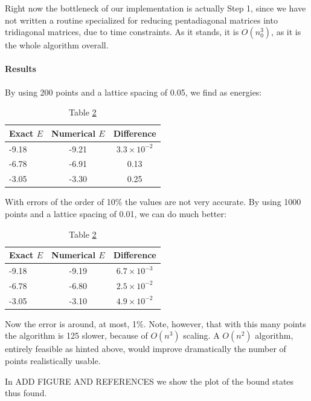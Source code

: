 \documentclass[a4paper,11]{article}
\begin{document}
Right now the bottleneck of our implementation is actually Step 1, since we 
have not written a routine specialized for reducing pentadiagonal matrices
into tridiagonal matrices, due to time constraints. 
As it stands, it is $O(n_{0}^{3})$, as it is the whole algorithm overall.

\paragraph{Results}

By using 200 points and a lattice spacing of 0.05, we find as energies:

\begin{table}[ht]
	\centering
	\begin{tabular}{l | c | c }
		Exact $E$ & Numerical $E$ & Difference \\
		\hline
		-9.18 & -9.21 & $3.3 \times 10^{-2}$ \\
		-6.78 & -6.91 & 0.13 \\
		-3.05 & -3.30 & 0.25
	\end{tabular}
	\caption{Table \ref{table:poschl_teller}}
	\label{table:poschl_teller}
\end{table}

With errors of the order of 10\% the values are not very accurate.
By using 1000 points and a lattice spacing of 0.01, we can do much better:

\begin{table}[ht]
	\centering
	\begin{tabular}{l | c | c }
		Exact $E$ & Numerical $E$ & Difference \\
		\hline
		-9.18 & -9.19 & $6.7 \times 10^{-3}$ \\
		-6.78 & -6.80 & $2.5 \times 10^{-2}$ \\
		-3.05 & -3.10 & $4.9 \times 10^{-2}$
	\end{tabular}
	\caption{Table \ref{table:poschl_teller}}
	\label{table:poschl_teller}
\end{table}

Now the error is around, at most, 1\%. Note, however, that with this many points
the algorithm is 125 slower, because of $O(n^{3})$ scaling.
A $O(n^{2})$ algorithm, entirely feasible as hinted above, would improve 
dramatically the number of points realistically usable.

In ADD FIGURE AND REFERENCES we show the plot of the bound states thus found.

\nocite{*}

\printbibliography[
heading=bibintoc,
title={Bibliography}
]
\end{document}
